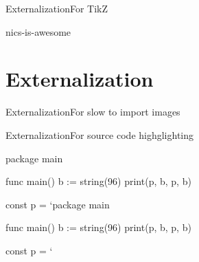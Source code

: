 \begin{slide}{Externalization}{For TikZ}
  \begin{nicscolumn}
    \begin{nicsextern}{nics-is-awesome}
    \end{nicsextern}
  \end{nicscolumn}
\end{slide}

\section{Externalization}

\begin{slide}{Externalization}{For slow to import images}
  \begin{nicscolumn}[3cm]
    \begin{nicsextern}{}
    \end{nicsextern}
  \end{nicscolumn}
\end{slide}

\begin{slide}{Externalization}{For source code highglighting}
  \begin{nicscolumn}
    \begin{nicsextern}[height=5.5cm]{}
      package main

      func main() {
        b := string(96)
        print(p, b, p, b)
      }

      const p = `package main

      func main() {
        b := string(96)
        print(p, b, p, b)
      }

      const p = `
    \end{nicsextern}
  \end{nicscolumn}
\end{slide}


